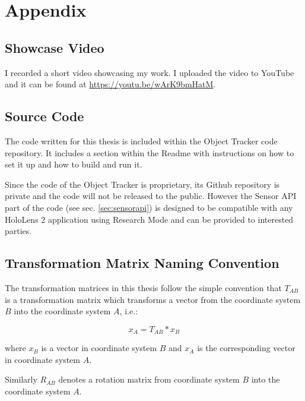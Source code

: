 \chapter{Appendix}

\section{Showcase Video}\label{apx:video}

I recorded a short video showcasing my work. I uploaded the video to YouTube and it can be found at \url{https://youtu.be/wArK9bmHatM}.

\section{Source Code}

The code written for this thesis is included within the Object Tracker code repository. It includes a section within the Readme with instructions on how to set it up and how to build and run it.

Since the code of the Object Tracker is proprietary, its Github repository is private and the code will not be released to the public. However the Sensor API part of the code (see sec. \ref{sec:sensorapi}) is designed to be compatible with any HoloLens 2 application using Research Mode and can be provided to interested parties.

\section{Transformation Matrix Naming Convention}\label{apx:naming}

The transformation matrices in this thesis follow the simple convention that $T_{AB}$ is a transformation matrix which transforms a vector from the coordinate system $B$ into the coordinate system $A$, i.e.:

\begin{equation*}
    x_A = T_{AB} * x_B
\end{equation*}

where $x_B$ is a vector in coordinate system $B$ and $x_A$ is the corresponding vector in coordinate system $A$.

Similarly $R_{AB}$ denotes a rotation matrix from coordinate system $B$ into the coordinate system $A$.